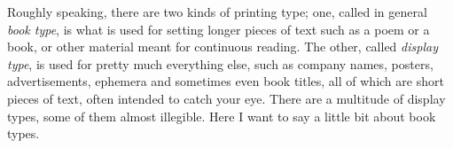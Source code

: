 \documentclass[10pt,a4paper,extrafontsizes]{memoir}
\newcommand{\PWnote}[2]{}
\begin{document}
\PWnote{2009/04/25}{Added longish section on book types}
\PWnote{2009/04/25}{Used endnotes in book types section}

\begin{paracol}{2}
\switchEng
    Roughly speaking, there are two kinds of printing type;
one, called 
in general \emph{book type}, 
is what is used for setting longer pieces 
of text such as a poem or a book, or other material meant for continuous
reading. The other, called \emph{display type}, is used 
for pretty much everything else, such as company names, posters,
advertisements, ephemera and sometimes even book titles, all of which are 
short pieces of text, often intended to catch your eye. There are a multitude
of display types, some of them almost illegible. Here I want to say a little
bit about book types.
\end{paracol}
\end{document}
